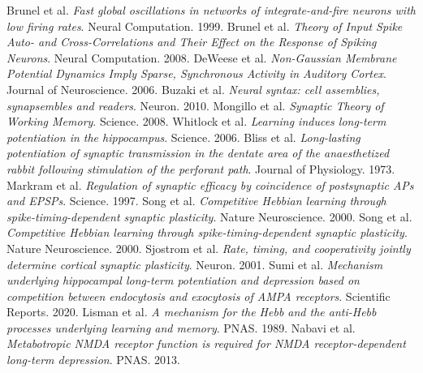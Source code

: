 \documentclass{ucetd}
\begin{document}
\newline
\noindent [29] Brunel et al. \textit{Fast global oscillations in networks of integrate-and-fire neurons with low firing rates}. Neural Computation. 1999.
\newline
\noindent [30] Brunel et al. \textit{Theory of Input Spike Auto- and Cross-Correlations and Their Effect on the Response of Spiking Neurons}. Neural Computation. 2008.
\newline
\noindent [31] DeWeese et al. \textit{Non-Gaussian Membrane Potential Dynamics Imply Sparse, Synchronous Activity in Auditory Cortex}. Journal of Neuroscience. 2006.
\newline
\noindent [32] Buzaki et al. \textit{Neural syntax: cell assemblies, synapsembles and readers}. Neuron. 2010.
\newline
\noindent [33] Mongillo et al. \textit{Synaptic Theory of Working Memory}. Science. 2008.
\newline
\noindent [34] Whitlock et al. \textit{Learning induces long-term potentiation in the hippocampus}. Science. 2006.
\newline
\noindent [35] Bliss et al. \textit{Long-lasting potentiation of synaptic transmission in the dentate area of the anaesthetized rabbit following stimulation of the perforant path}. Journal of Physiology. 1973.
\newline
\noindent [36] Markram et al. \textit{Regulation of synaptic efficacy by coincidence of postsynaptic APs and EPSPs}. Science. 1997.
\newline
\noindent [37] Song et al. \textit{Competitive Hebbian learning through spike-timing-dependent synaptic plasticity}. Nature Neuroscience. 2000.
\newline
\noindent [38] Song et al. \textit{Competitive Hebbian learning through spike-timing-dependent synaptic plasticity}. Nature Neuroscience. 2000.
\newline
\noindent [39] Sjostrom et al. \textit{Rate, timing, and cooperativity jointly determine cortical synaptic plasticity}. Neuron. 2001.
\newline
\noindent [40] Sumi et al. \textit{Mechanism underlying hippocampal long-term potentiation and depression based on competition between endocytosis and exocytosis of AMPA receptors}. Scientific Reports. 2020.
\newline
\noindent [41] Lisman et al. \textit{A mechanism for the Hebb and the anti-Hebb processes underlying learning and memory}. PNAS. 1989.
\newline
\noindent [42] Nabavi et al. \textit{Metabotropic NMDA receptor function is required for NMDA receptor-dependent long-term depression}. PNAS. 2013.
\end{document}
